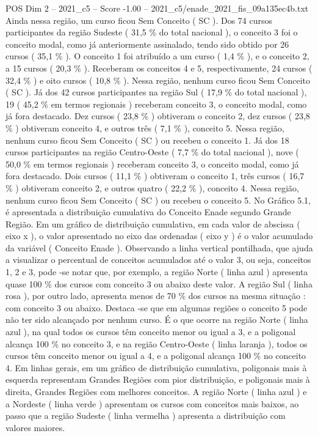\begin{textsample}{POS Dim 2 – 2021\_c5 – Score -1.00 – 2021\_c5/enade\_2021\_fis\_09a135ec4b.txt}
Ainda nessa região, um curso ficou Sem Conceito ( SC ).
Dos 74 cursos participantes da região Sudeste ( 31,5 \% do total nacional ), o conceito 3 foi o conceito modal, como já anteriormente assinalado, tendo sido obtido por 26 cursos ( 35,1 \% ).
O conceito 1 foi atribuído a um curso ( 1,4 \% ), e o conceito 2, a 15 cursos ( 20,3 \% ).
Receberam os conceitos 4 e 5, respectivamente, 24 cursos ( 32,4 \% ) e oito cursos ( 10,8 \% ).
Nessa região, nenhum curso ficou Sem Conceito ( SC ).
Já dos 42 cursos participantes na região Sul ( 17,9 \% do total nacional ), 19 ( 45,2 \% em termos regionais ) receberam conceito 3, o conceito modal, como já fora destacado.
Dez cursos ( 23,8 \% ) obtiveram o conceito 2, dez cursos ( 23,8 \% ) obtiveram conceito 4, e outros três ( 7,1 \% ), conceito 5.
Nessa região, nenhum curso ficou Sem Conceito ( SC ) ou recebeu o conceito 1.
Já dos 18 cursos participantes na região Centro-Oeste ( 7,7 \% do total nacional ), nove ( 50,0 \% em termos regionais ) receberam conceito 3, o conceito modal, como já fora destacado.
Dois cursos ( 11,1 \% ) obtiveram o conceito 1, três cursos ( 16,7 \% ) obtiveram conceito 2, e outros quatro ( 22,2 \% ), conceito 4.
Nessa região, nenhum curso ficou Sem Conceito ( SC ) ou recebeu o conceito 5.
No Gráfico 5.1, é apresentada a distribuição cumulativa do Conceito Enade segundo Grande Região.
Em um gráfico de distribuição cumulativa, em cada valor de abscissa ( eixo x ), o valor apresentado no eixo das ordenadas ( eixo y ) é o valor acumulado da variável ( Conceito Enade ).
Observando a linha vertical pontilhada, que ajuda a visualizar o percentual de conceitos acumulados até o valor 3, ou seja, conceitos 1, 2 e 3, pode -se notar que, por exemplo, a região Norte ( linha azul ) apresenta quase 100 \% dos cursos com conceito 3 ou abaixo deste valor.
A região Sul ( linha rosa ), por outro lado, apresenta menos de 70 \% dos cursos na mesma situação : com conceito 3 ou abaixo.
Destaca -se que em algumas regiões o conceito 5 pode não ter sido alcançado por nenhum curso.
É o que ocorre na região Norte ( linha azul ), na qual todos os cursos têm conceito menor ou igual a 3, e a poligonal alcança 100 \% no conceito 3, e na região Centro-Oeste ( linha laranja ), todos os cursos têm conceito menor ou igual a 4, e a poligonal alcança 100 \% no conceito 4.
Em linhas gerais, em um gráfico de distribuição cumulativa, poligonais mais à esquerda representam Grandes Regiões com pior distribuição, e poligonais mais à direita, Grandes Regiões com melhores conceitos.
A região Norte ( linha azul ) e a Nordeste ( linha verde ) apresentam os cursos com conceitos mais baixos, ao passo que a região Sudeste ( linha vermelha ) apresenta a distribuição com valores maiores.

\end{textsample}
